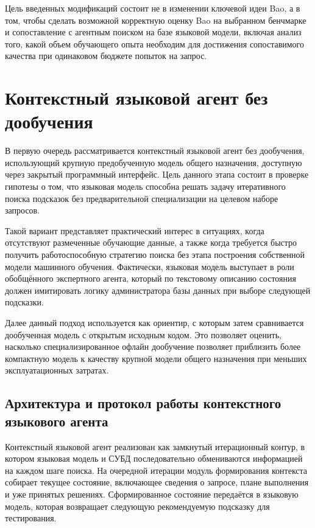 Цель введенных модификаций состоит не в изменении ключевой идеи Bao, а в том, чтобы сделать возможной корректную оценку Bao на выбранном бенчмарке и сопоставление с агентным поиском на базе языковой модели, включая анализ того, какой объем обучающего опыта необходим для достижения сопоставимого качества при одинаковом бюджете попыток на запрос.

\section{Контекстный языковой агент без дообучения}\label{sec:ch4_zeroshot}

В первую очередь рассматривается контекстный языковой агент без дообучения, использующий крупную предобученную модель общего назначения, доступную через закрытый программный интерфейс. Цель данного этапа состоит в проверке гипотезы о том, что языковая модель способна решать задачу итеративного поиска подсказок без предварительной специализации на целевом наборе запросов.

Такой вариант представляет практический интерес в ситуациях, когда отсутствуют размеченные обучающие данные, а также когда требуется быстро получить работоспособную стратегию поиска без этапа построения собственной модели машинного обучения. Фактически, языковая модель выступает в роли обобщённого экспертного агента, который по текстовому описанию состояния должен имитировать логику администратора базы данных при выборе следующей подсказки.

Далее данный подход используется как ориентир, с которым затем сравнивается дообученная модель с открытым исходным кодом. Это позволяет оценить, насколько специализированное офлайн дообучение позволяет приблизить более компактную модель к качеству крупной модели общего назначения при меньших эксплуатационных затратах.

\subsection{Архитектура и протокол работы контекстного языкового агента}\label{subsec:ch4_loop}

Контекстный языковой агент реализован как замкнутый итерационный контур, в котором языковая модель и СУБД последовательно обмениваются информацией на каждом шаге поиска. На очередной итерации модуль формирования контекста собирает текущее состояние, включающее сведения о запросе, плане выполнения и уже принятых решениях. Сформированное состояние передаётся в языковую модель, которая возвращает следующую рекомендуемую подсказку для тестирования.

